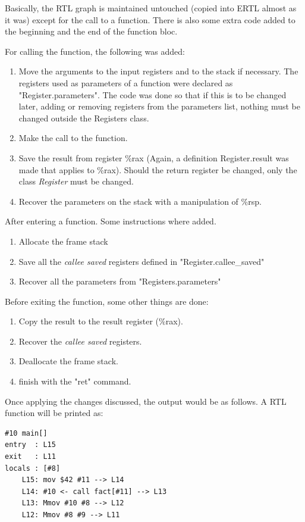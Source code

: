 \documentclass[conference]{IEEEtran}
\theoremstyle{definition}
\begin{document}
Basically, the RTL graph is maintained untouched (copied into ERTL almost as it was) except for the call to a function. There is also some extra code added to the beginning and the end of the function bloc.

For calling the function, the following was added:

\begin{enumerate}
	\item Move the arguments to the input registers and to the stack if necessary. The registers used as parameters of a function were declared as "Register.parameters". The code was done so that if this is to be changed later, adding or removing registers from the parameters list, nothing must be changed outside the Registers class.
	\item Make the call to the function.
	\item Save the result from register \%rax (Again, a definition Register.result was made that applies to \%rax). Should the return register be changed, only the class \textit{Register} must be changed.
	\item Recover the parameters on the stack with a manipulation of \%rsp.
\end{enumerate}

After entering a function. Some instructions where added.

\begin{enumerate}
	\item Allocate the frame stack
	\item Save all the \textit{callee saved} registers defined in "Register.callee\_saved"
	\item Recover all the parameters from "Registers.parameters"
\end{enumerate}

Before exiting the function, some other things are done:

\begin{enumerate}
	\item Copy the result to the result register (\%rax).
	\item Recover the \textit{callee saved} registers.
	\item Deallocate the frame stack.
	\item finish with the "ret" command.
\end{enumerate}

Once applying the changes discussed, the output would be as follows. A RTL function will be printed as:

\begin{lstlisting}
#10 main[]
entry  : L15
exit   : L11
locals : [#8]
	L15: mov $42 #11 --> L14
	L14: #10 <- call fact[#11] --> L13
	L13: Mmov #10 #8 --> L12
	L12: Mmov #8 #9 --> L11
\end{lstlisting}
\end{document}
